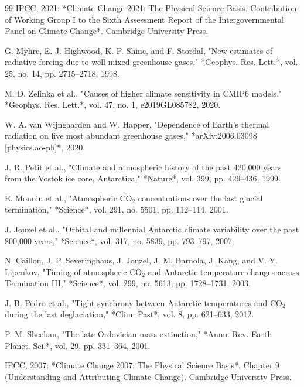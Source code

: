 \documentclass[10pt,twocolumn]{article}
\begin{document}
\begin{thebibliography}{99}
  IPCC, 2021: *Climate Change 2021: The Physical Science Basis. Contribution of Working Group I to the Sixth Assessment Report of the Intergovernmental Panel on Climate Change*. Cambridge University Press.

  G. Myhre, E. J. Highwood, K. P. Shine, and F. Stordal, "New estimates of radiative forcing due to well mixed greenhouse gases," *Geophys. Res. Lett.*, vol. 25, no. 14, pp. 2715–2718, 1998.

  M. D. Zelinka et al., "Causes of higher climate sensitivity in CMIP6 models," *Geophys. Res. Lett.*, vol. 47, no. 1, e2019GL085782, 2020.

  W. A. van Wijngaarden and W. Happer, "Dependence of Earth's thermal radiation on five most abundant greenhouse gases," *arXiv:2006.03098 [physics.ao-ph]*, 2020.

  J. R. Petit et al., "Climate and atmospheric history of the past 420,000 years from the Vostok ice core, Antarctica," *Nature*, vol. 399, pp. 429–436, 1999.

  E. Monnin et al., "Atmospheric $\text{CO}_2$ concentrations over the last glacial termination," *Science*, vol. 291, no. 5501, pp. 112–114, 2001.

  J. Jouzel et al., "Orbital and millennial Antarctic climate variability over the past 800,000 years," *Science*, vol. 317, no. 5839, pp. 793–797, 2007.

  N. Caillon, J. P. Severinghaus, J. Jouzel, J. M. Barnola, J. Kang, and V. Y. Lipenkov, "Timing of atmospheric $\text{CO}_2$ and Antarctic temperature changes across Termination III," *Science*, vol. 299, no. 5613, pp. 1728–1731, 2003.

  J. B. Pedro et al., "Tight synchrony between Antarctic temperatures and $\text{CO}_2$ during the last deglaciation," *Clim. Past*, vol. 8, pp. 621–633, 2012.

  P. M. Sheehan, "The late Ordovician mass extinction," *Annu. Rev. Earth Planet. Sci.*, vol. 29, pp. 331–364, 2001.

  IPCC, 2007: *Climate Change 2007: The Physical Science Basis*. Chapter 9 (Understanding and Attributing Climate Change). Cambridge University Press.


\end{thebibliography}
\end{document}
